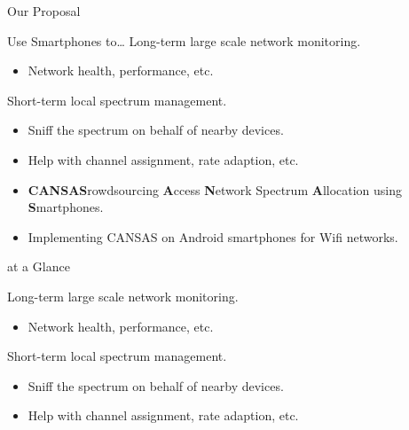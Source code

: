 \begin{frame}{Our Proposal}
  \begin{block}{Use Smartphones to\ldots}
    Long-term large scale network monitoring.
    \begin{itemize}
      \item Network health, performance, etc.
    \end{itemize}
    Short-term local spectrum management.
    \begin{itemize}
      \item Sniff the spectrum on behalf of nearby devices.
      \item Help with channel assignment, rate adaption, etc.
    \end{itemize}
  \end{block}
  \begin{itemize}
    \item {\large\textbf{CANSAS}}rowdsourcing {\large
      \textbf{A}}ccess {\large \textbf{N}}etwork {\large \textbf{}S}pectrum
      {\large \textbf{A}}llocation using {\large \textbf{S}}martphones.
    \item {\large\textbf{\PS{}}}\quad Implementing CANSAS on Android smartphones
      for Wifi networks.
  \end{itemize}
\end{frame}

\begin{frame}{\PS{} at a Glance}
  \begin{figure}
    \centering
  \end{figure}
  Long-term large scale network monitoring.
  \begin{itemize}
    \item Network health, performance, etc.
  \end{itemize}
  Short-term local spectrum management.
  \begin{itemize}
    \item Sniff the spectrum on behalf of nearby devices.
    \item Help with channel assignment, rate adaption, etc.
  \end{itemize}
\end{frame}
